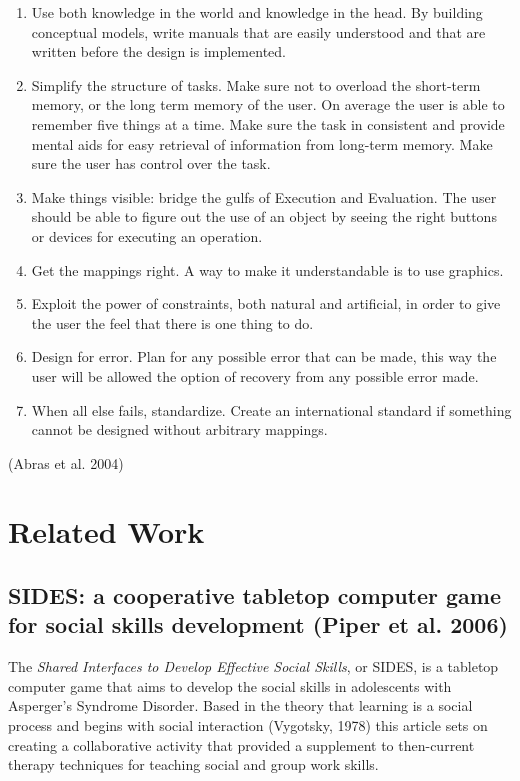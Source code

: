 \documentclass[runningheads]{llncs}
\begin{document}
\begin{enumerate}
    \item Use both knowledge in the world and knowledge in the head. By building conceptual models, write manuals that are easily understood and that are written before the design is implemented. 
    \item Simplify the structure of tasks. Make sure not to overload the short-term memory, or the long term memory of the user.  On average the user is able to remember five things at a time. Make sure the task in consistent and provide mental aids for easy retrieval of information from long-term memory. Make sure the user has control over the task. 
    \item Make things visible: bridge the gulfs of Execution and Evaluation. The user should be able to figure out the use of an object by seeing the right buttons or devices for executing an operation.  
    \item Get the mappings right. A way to make it understandable is to use graphics. 
    \item Exploit the power of constraints, both natural and artificial, in order to give the user the feel that there is one thing to do. 
    \item Design for error. Plan for any possible error that can be made, this way the user will be allowed the option of recovery from any possible error made. 
    \item When all else fails, standardize. Create an international standard if something cannot be designed without arbitrary mappings.
\end{enumerate}
\par (Abras et al. 2004)

\newpage
\section{Related Work}

\subsection{SIDES: a cooperative tabletop computer game for social skills development (Piper et al. 2006)}

\par The \textit{Shared Interfaces to Develop Effective Social Skills}, or SIDES, is a tabletop computer game that aims to develop the social skills in adolescents with Asperger's Syndrome Disorder. Based in the theory that learning is a social process and begins with social interaction (Vygotsky, 1978) this article sets on creating a collaborative activity that provided a supplement to then-current therapy techniques for teaching social and group work skills.
\end{document}
